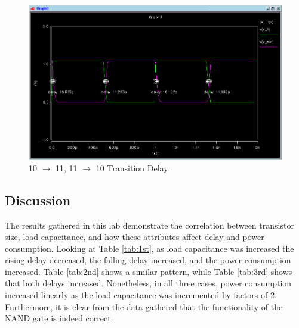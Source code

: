 \documentclass[12pt]{article}
\begin{document}
\begin{figure}
\centering
\includegraphics[width=1\linewidth]{10_11_11_10}
\caption{10 $\to$ 11, 11 $\to$ 10 Transition Delay}
\label{fig:10_11_11_10}
\end{figure}

\subsection{Discussion}
The results gathered in this lab demonstrate the correlation between transistor size, load capacitance, and how these attributes affect delay and power consumption. Looking at Table \ref{tab:1st}, as load capacitance was increased the rising delay decreased, the falling delay increased, and the power consumption increased. Table \ref{tab:2nd} shows a similar pattern, while Table \ref{tab:3rd} shows that both delays increased. Nonetheless, in all three cases, power consumption increased linearly as the load capacitance was incremented by factors of 2. Furthermore, it is clear from the data gathered that the functionality of the NAND gate is indeed correct.
\end{document}
